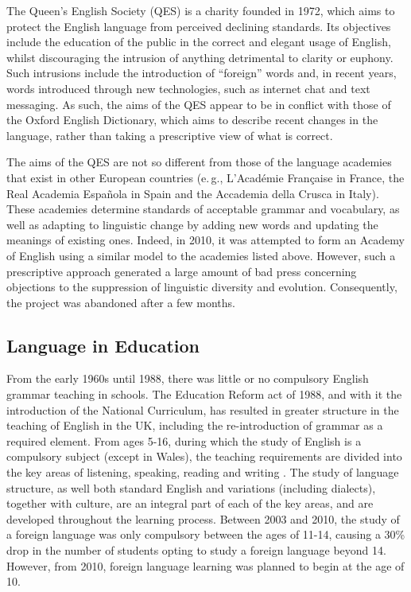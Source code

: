 \begin{multicols}{2}
The Queen’s English Society \cite{qes} (QES) is a charity founded in 1972, which aims to protect the English language from perceived declining standards. Its objectives include the education of the public in the correct and elegant usage of English, whilst discouraging the intrusion of anything detrimental to clarity or euphony. Such intrusions include the introduction of “foreign” words and, in recent years, words introduced through new technologies, such as internet chat and text messaging. As such, the aims of the QES appear to be in conflict with those of the Oxford English Dictionary, which aims to describe recent changes in the language, rather than taking a prescriptive view of what is correct.
    
The aims of the QES are not so different from those of the language academies that exist in other European countries (e.\,g., L'Acad\'{e}mie Fran\c{c}aise in France, the Real Academia Espa\~{n}ola in Spain and the Accademia della Crusca in Italy). These academies determine standards of acceptable grammar and vocabulary, as well as adapting to linguistic change by adding new words and updating the meanings of existing ones. Indeed, in 2010, it was attempted to form an Academy of English using a similar model to the academies listed above.  However, such a prescriptive approach generated a large amount of bad press concerning objections to the suppression of linguistic diversity and evolution. Consequently, the project was abandoned after a few months.   

\subsection{Language in Education}

From the early 1960s until 1988, there was little or no compulsory English grammar teaching in schools. The Education Reform act of 1988, and with it the introduction of the National Curriculum, has resulted in greater structure in the teaching of English in the UK, including the re-introduction of grammar as a required element. From ages 5-16, during which the study of English is a compulsory subject (except in Wales), the teaching requirements are divided into the key areas of listening, speaking, reading and writing \cite{curric}. The study of language structure, as well both standard English and variations (including dialects), together with culture, are an integral part of each of the key areas, and are developed throughout the learning process. Between 2003 and 2010, the study of a foreign language was only compulsory between the ages of 11-14, causing a 30\% drop in the number of students opting to study a foreign language beyond 14. However, from 2010, foreign language learning was planned to begin at the age of 10.
   

\end{multicols}
